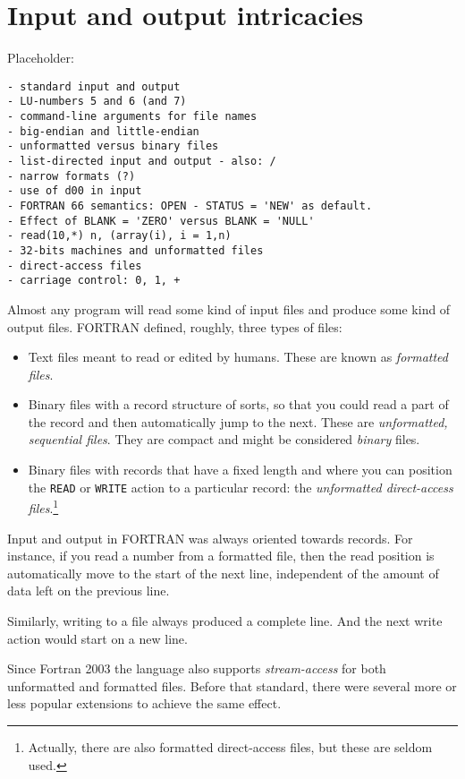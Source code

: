 \section{Input and output intricacies}
Placeholder:
\begin{verbatim}
- standard input and output
- LU-numbers 5 and 6 (and 7)
- command-line arguments for file names
- big-endian and little-endian
- unformatted versus binary files
- list-directed input and output - also: /
- narrow formats (?)
- use of d00 in input
- FORTRAN 66 semantics: OPEN - STATUS = 'NEW' as default.
- Effect of BLANK = 'ZERO' versus BLANK = 'NULL'
- read(10,*) n, (array(i), i = 1,n)
- 32-bits machines and unformatted files
- direct-access files
- carriage control: 0, 1, +
\end{verbatim}

Almost any program will read some kind of input files and produce some kind of
output files. FORTRAN defined, roughly, three types of files:
\begin{itemize}
\item
Text files meant to read or edited by humans. These are known as \emph{formatted files}.
\item
Binary files with a record structure of sorts, so that you could read a part of the
record and then automatically jump to the next. These are \emph{unformatted, sequential files}.
They are compact and might be considered \emph{binary} files.
\item
Binary files with records that have a fixed length and where you can position the \verb+READ+
or \verb+WRITE+ action to a particular record: the \emph{unformatted direct-access files}.\footnote{
Actually, there are also formatted direct-access files, but these are seldom used.}
\end{itemize}

Input and output in FORTRAN was always oriented towards records. For instance, if you read a number
from a formatted file, then the read position is automatically move to the start of the next line,
independent of the amount of data left on the previous line.

Similarly, writing to a file always produced a complete line. And the next write action would start
on a new line.

Since Fortran 2003 the language also supports \emph{stream-access} for both unformatted and formatted
files. Before that standard, there were several more or less popular extensions to achieve the same
effect.


